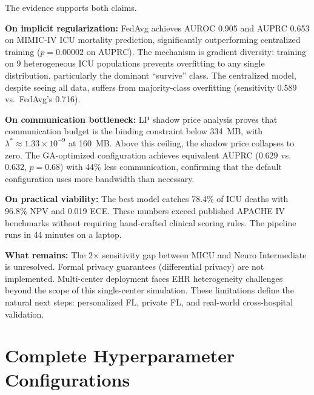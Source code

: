 \documentclass[11pt,a4paper]{report}
\begin{document}
The evidence supports both claims.

\textbf{On implicit regularization:} FedAvg achieves AUROC 0.905 and AUPRC 0.653 on MIMIC-IV ICU mortality prediction, significantly outperforming centralized training ($p = 0.00002$ on AUPRC). The mechanism is gradient diversity: training on 9 heterogeneous ICU populations prevents overfitting to any single distribution, particularly the dominant ``survive'' class. The centralized model, despite seeing all data, suffers from majority-class overfitting (sensitivity 0.589 vs.\ FedAvg's 0.716).

\textbf{On communication bottleneck:} LP shadow price analysis proves that communication budget is the binding constraint below 334~MB, with $\lambda^* \approx 1.33 \times 10^{-9}$ at 160~MB. Above this ceiling, the shadow price collapses to zero. The GA-optimized configuration achieves equivalent AUPRC ($0.629$ vs.\ $0.632$, $p = 0.68$) with 44\% less communication, confirming that the default configuration uses more bandwidth than necessary.

\textbf{On practical viability:} The best model catches 78.4\% of ICU deaths with 96.8\% NPV and 0.019 ECE. These numbers exceed published APACHE IV benchmarks without requiring hand-crafted clinical scoring rules. The pipeline runs in 44 minutes on a laptop.

\textbf{What remains:} The 2$\times$ sensitivity gap between MICU and Neuro Intermediate is unresolved. Formal privacy guarantees (differential privacy) are not implemented. Multi-center deployment faces EHR heterogeneity challenges beyond the scope of this single-center simulation. These limitations define the natural next steps: personalized FL, private FL, and real-world cross-hospital validation.


\appendix

\chapter{Complete Hyperparameter Configurations}
\end{document}
